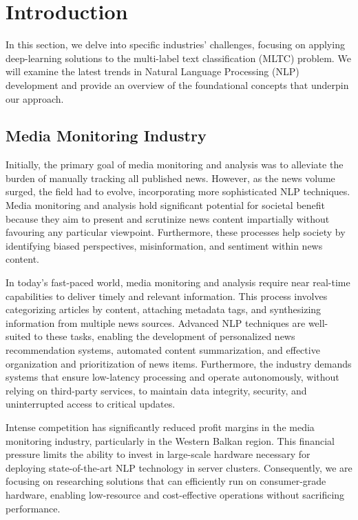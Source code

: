 % 
\chapter{Introduction}
In this section, we delve into specific industries' challenges, focusing on applying deep-learning solutions to the multi-label text classification (MLTC) problem. We will examine the latest trends in Natural Language Processing (NLP) development and provide an overview of the foundational concepts that underpin our approach.

\section{Media Monitoring Industry}
Initially, the primary goal of media monitoring and analysis was to alleviate the burden of manually tracking all published news. However, as the news volume surged, the field had to evolve, incorporating more sophisticated NLP techniques. Media monitoring and analysis hold significant potential for societal benefit because they aim to present and scrutinize news content impartially without favouring any particular viewpoint. Furthermore, these processes help society by identifying biased perspectives, misinformation, and sentiment within news content.

In today's fast-paced world, media monitoring and analysis require near real-time capabilities to deliver timely and relevant information. This process involves categorizing articles by content, attaching metadata tags, and synthesizing information from multiple news sources. Advanced NLP techniques are well-suited to these tasks, enabling the development of personalized news recommendation systems, automated content summarization, and effective organization and prioritization of news items. Furthermore, the industry demands systems that ensure low-latency processing and operate autonomously, without relying on third-party services, to maintain data integrity, security, and uninterrupted access to critical updates.

Intense competition has significantly reduced profit margins in the media monitoring industry, particularly in the Western Balkan region. 
This financial pressure limits the ability to invest in large-scale hardware necessary for deploying state-of-the-art NLP technology in server clusters. 
Consequently, we are focusing on researching solutions that can efficiently run on consumer-grade hardware, enabling low-resource and cost-effective operations without sacrificing performance.

